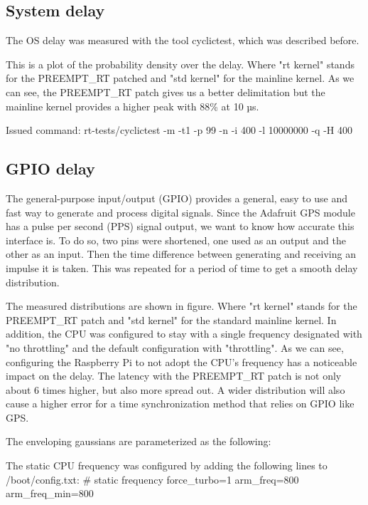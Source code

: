 \subsection{System delay}

The OS delay was measured with the tool cyclictest, which was described before.


This is a plot of the probability density over the delay. Where "rt kernel" stands for the PREEMPT\_RT patched and "std kernel" for the mainline kernel.
As we can see, the PREEMPT\_RT patch gives us a better delimitation but the mainline kernel provides a higher peak with 88\% at 10 µs.


Issued command:
rt-tests/cyclictest -m -t1 -p 99 -n -i 400 -l 10000000 -q -H 400

\subsection{GPIO delay}

The general-purpose input/output (GPIO) provides a general, easy to use and fast way to generate and process digital signals. Since the Adafruit GPS module has a pulse per second (PPS) signal output, we want to know how accurate this interface is.
To do so, two pins were shortened, one used as an output and the other as an input. Then the time difference between generating and receiving an impulse it is taken. This was repeated for a period of time to get a smooth delay distribution.


The measured distributions are shown in figure. Where "rt kernel" stands for the PREEMPT\_RT patch and "std kernel" for the standard mainline kernel. In addition, the CPU was configured to stay with a single frequency designated with "no throttling" and the default configuration with "throttling".
As we can see, configuring the Raspberry Pi to not adopt the CPU’s frequency has a noticeable impact on the delay. The latency with the PREEMPT\_RT patch is not only about 6 times higher, but also more spread out. A wider distribution will also cause a higher error for a time synchronization method that relies on GPIO like GPS.

The enveloping gaussians are parameterized as the following:


The static CPU frequency was configured by adding the following lines to /boot/config.txt:
\# static frequency
force\_turbo=1
arm\_freq=800
arm\_freq\_min=800

